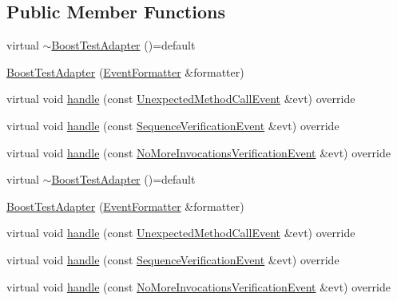 \subsection*{Public Member Functions}
\begin{DoxyCompactItemize}
\item 
virtual \mbox{\hyperlink{structfakeit_1_1BoostTestAdapter_a45ef3568bfd4b8ff4547b040ff040b19}{$\sim$\+Boost\+Test\+Adapter}} ()=default
\item 
\mbox{\hyperlink{structfakeit_1_1BoostTestAdapter_a794ccd3414899a50dec8a1ec38bac988}{Boost\+Test\+Adapter}} (\mbox{\hyperlink{structfakeit_1_1EventFormatter}{Event\+Formatter}} \&formatter)
\item 
virtual void \mbox{\hyperlink{structfakeit_1_1BoostTestAdapter_a8c5e79f154223dce9fa9cbabd1bb3242}{handle}} (const \mbox{\hyperlink{structfakeit_1_1UnexpectedMethodCallEvent}{Unexpected\+Method\+Call\+Event}} \&evt) override
\item 
virtual void \mbox{\hyperlink{structfakeit_1_1BoostTestAdapter_a8ba1497e33a41a7927668860f56295b6}{handle}} (const \mbox{\hyperlink{structfakeit_1_1SequenceVerificationEvent}{Sequence\+Verification\+Event}} \&evt) override
\item 
virtual void \mbox{\hyperlink{structfakeit_1_1BoostTestAdapter_aef1bc4f059166c4e403bdb1d31b68fc5}{handle}} (const \mbox{\hyperlink{structfakeit_1_1NoMoreInvocationsVerificationEvent}{No\+More\+Invocations\+Verification\+Event}} \&evt) override
\item 
virtual \mbox{\hyperlink{structfakeit_1_1BoostTestAdapter_a45ef3568bfd4b8ff4547b040ff040b19}{$\sim$\+Boost\+Test\+Adapter}} ()=default
\item 
\mbox{\hyperlink{structfakeit_1_1BoostTestAdapter_a794ccd3414899a50dec8a1ec38bac988}{Boost\+Test\+Adapter}} (\mbox{\hyperlink{structfakeit_1_1EventFormatter}{Event\+Formatter}} \&formatter)
\item 
virtual void \mbox{\hyperlink{structfakeit_1_1BoostTestAdapter_a8c5e79f154223dce9fa9cbabd1bb3242}{handle}} (const \mbox{\hyperlink{structfakeit_1_1UnexpectedMethodCallEvent}{Unexpected\+Method\+Call\+Event}} \&evt) override
\item 
virtual void \mbox{\hyperlink{structfakeit_1_1BoostTestAdapter_a8ba1497e33a41a7927668860f56295b6}{handle}} (const \mbox{\hyperlink{structfakeit_1_1SequenceVerificationEvent}{Sequence\+Verification\+Event}} \&evt) override
\item 
virtual void \mbox{\hyperlink{structfakeit_1_1BoostTestAdapter_aef1bc4f059166c4e403bdb1d31b68fc5}{handle}} (const \mbox{\hyperlink{structfakeit_1_1NoMoreInvocationsVerificationEvent}{No\+More\+Invocations\+Verification\+Event}} \&evt) override
\end{DoxyCompactItemize}


